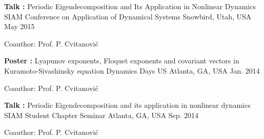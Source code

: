 


\begin{cventries}


\cventry
{\textbf{Talk :} Periodic Eigendecomposition and Its Application in Nonlinear Dynamics} %
{SIAM Conference on Application of Dynamical Systems} %
{Snowbird, Utah, USA} %
{May 2015} %
{ %
\begin{cvitems}
  \item {Coauthor: Prof. P. Cvitanović}
\end{cvitems}
}


\cventry
{\textbf{Poster :} Lyapunov exponents, Floquet exponents and covariant vectors in Kuramoto-Sivashinsky equation}
{Dynamics Days US} %
{Atlanta, GA, USA } %
{Jan. 2014} %
{ %
\begin{cvitems}
  \item {Coauthor: Prof. P. Cvitanović}
\end{cvitems}
}

\cventry
{\textbf{Talk :} Periodic Eigendecomposition and its application in nonlinear dynamics}
{SIAM Student Chapter Seminar}
{Atlanta, GA, USA}
{Sep. 2014}
{
  \begin{cvitems}
  \item {Coauthor: Prof. P. Cvitanović}
  \end{cvitems}
}


\end{cventries}
